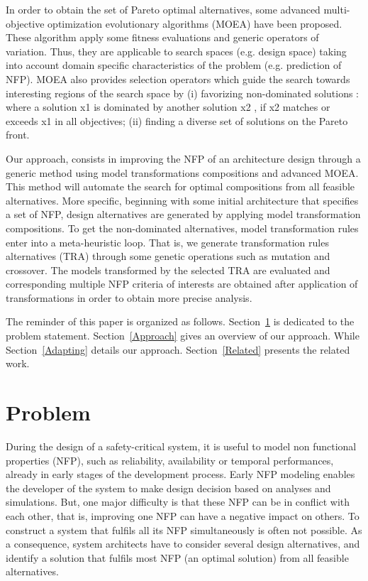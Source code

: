 \documentclass[conference]{IEEEtran}
\begin{document}
In order to obtain the set of Pareto optimal alternatives, some advanced multi-objective optimization evolutionary algorithms (MOEA) have been proposed. These algorithm apply some fitness evaluations and generic operators of variation. Thus, they are applicable to search spaces (e.g. design space) taking into account domain specific characteristics of the problem (e.g. prediction of NFP). MOEA also provides selection operators which guide the search towards interesting regions of the search space by (i) favorizing non-dominated solutions : where a solution x1 is dominated by another solution x2 , if x2 matches or exceeds x1 in all objectives; (ii) finding a diverse set of solutions on the Pareto front.

Our approach, consists in improving the NFP of an architecture design through a generic method using model transformations compositions and advanced MOEA. This method will automate the search for optimal compositions from all feasible alternatives. More specific, beginning with some initial architecture that specifies a set of NFP, design alternatives are generated by applying model transformation compositions\cite{Jouault:2005:TMA:2153686.2153705}. To get the non-dominated alternatives, model transformation rules enter into a meta-heuristic loop. That is, we generate transformation rules alternatives (TRA) through some genetic operations such as mutation and crossover. The models transformed by the selected TRA are evaluated and corresponding multiple NFP criteria of interests are obtained after application of transformations in order to obtain more precise analysis.

The reminder of this paper is organized as follows. Section~\ref{Problem} is dedicated to the problem statement. Section~\ref{Approach} gives an overview  of our approach. While Section~\ref{Adapting} details our approach. Section~\ref{Related} presents the related work.

\section{Problem}
\label{Problem}
During the design of a safety-critical system, it is useful to model non functional properties (NFP), such as reliability, availability or temporal performances, already in early stages of the development process. Early NFP modeling enables the developer of the system to make design decision based on analyses and simulations. But, one major difficulty is that these NFP can be in conflict with each other, that is, improving one NFP can have a negative impact on others. To construct a system that fulfils all its NFP simultaneously is often not possible. As a consequence, system architects have to consider several design alternatives, and identify a solution that fulfils most NFP (an optimal solution) from all feasible alternatives. 
\end{document}
